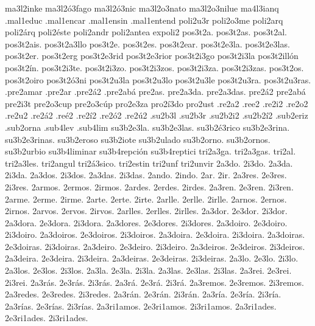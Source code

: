 {ma3l2inke 
ma3l2ó3fago 
ma3l2ó3nic 
ma3l2o3nato 
ma3l2o3nilue 
ma4l3ianq 
%
.mal1educ 
.mal1encar 
.mal1ensin 
.mal1entend 
%
%
poli2u3r 
poli2o3me 
poli2arq 
poli2árq 
poli2éste 
poli2andr 
poli2antea 
expoli2 
%
%
pos3t2a. 
pos3t2as. 
pos3t2al. 
pos3t2ais. 
pos3t2a3llo 
pos3t2e. 
pos3t2es. 
pos3t2ear. 
pos3t2e3la. 
pos3t2e3las. 
pos3t2er. 
pos3t2erg 
pos3t2e3rid 
pos3t2e3rior 
pos3t2i3go 
pos3t2i3la 
pos3t2illón 
pos3t2ín. 
pos3t2i3te. 
pos3t2i3zo. 
pos3t2i3zos. 
pos3t2i3za. 
pos3t2i3zas. 
pos3t2os. 
pos3t2oiro 
pos3t2ó3ni 
pos3t2u3la 
pos3t2u3lo 
pos3t2u3le 
pos3t2u3ra. 
pos3t2u3ras. 
%
%
.pre2amar 
.pre2ar 
.pre2á2 
.pre2abá 
%
pre2as. 
pre2a3da. 
pre2a3das. 
pre2á2 
pre2abá 
pre2i3t 
pre2o3cup 
pre2o3cúp 
%
%
pro2e3za 
pro2í3do 
pro2ust 
%
.re2a2 .ree2 .re2i2 .re2o2 .re2u2 .re2á2 .reé2 .re2í2 .re2ó2 .re2ú2 
%
.su2b3l .su2b3r 
%
.su2b2i2 
.su2b2í2 
.sub2eriz 
.sub2orna 
%
.sub4lev 
.sub4lim 
%
su3b2e3la. 
su3b2e3las. 
su3b2é3rico 
su3b2e3rina. 
su3b2e3rinas. 
su3b2eroso 
su3b2iote 
su3b2ulado 
su3b2orno. 
su3b2ornos. 
su3b2urbio 
%
su3b4liminar 
su3b4repción 
su3b4reptici 
%
%
tri2a3ga. 
tri2a3gas. 
tri2al. 
tri2a3les. 
tri2angul 
tri2á3sico. 
tri2estin 
tri2unf 
tri2unvir 
%
%
2a3do. 2i3do. 
2a3da. 2i3da. 
2a3dos. 2i3dos. 
2a3das. 2i3das. 
2ando. 2indo. 
2ar. 2ir. 
%
2a3res. 2e3res. 2i3res. 
2armos. 2ermos. 2irmos. 
2ardes. 2erdes. 2irdes. 
2a3ren. 2e3ren. 2i3ren. 
%
2arme. 2erme. 2irme. 
2arte. 2erte. 2irte. 
2arlle. 2erlle. 2irlle. 
2arnos. 2ernos. 2irnos. 
2arvos. 2ervos. 2irvos. 
2arlles. 2erlles. 2irlles. 
%
2a3dor. 2e3dor. 2i3dor. 
2a3dora. 2e3dora. 2i3dora. 
2a3dores. 2e3dores. 2i3dores. 
2a3doiro. 2e3doiro. 2i3doiro. 
2a3doiros. 2e3doiros. 2i3doiros. 
2a3doira. 2e3doira. 2i3doira. 
2a3doiras. 2e3doiras. 2i3doiras. 
2a3deiro. 2e3deiro. 2i3deiro. 
2a3deiros. 2e3deiros. 2i3deiros. 
2a3deira. 2e3deira. 2i3deira. 
2a3deiras. 2e3deiras. 2i3deiras. 
2a3lo. 2e3lo. 2i3lo. 
2a3los. 2e3los. 2i3los. 
2a3la. 2e3la. 2i3la. 
2a3las. 2e3las. 2i3las. 
2a3rei. 2e3rei. 2i3rei. 
2a3rás. 2e3rás. 2i3rás. 
2a3rá. 2e3rá. 2i3rá. 
2a3remos. 2e3remos. 2i3remos. 
2a3redes. 2e3redes. 2i3redes. 
2a3rán. 2e3rán. 2i3rán. 
%
2a3ría. 2e3ría. 2i3ría. 
2a3rías. 2e3rías. 2i3rías. 
2a3ri1amos. 2e3ri1amos. 2i3ri1amos. 
2a3ri1ades. 2e3ri1ades. 2i3ri1ades. 
}
